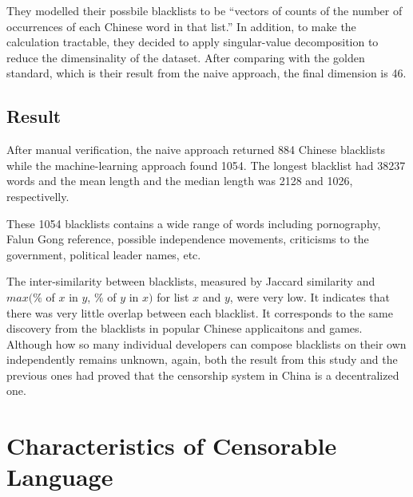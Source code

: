 \documentclass[11pt]{article} %
\begin{document}
They modelled their possbile blacklists to be ``vectors of counts of the number of occurrences of each Chinese word in that list.''\cite{knockel2018effect} In addition, to make the calculation tractable, they decided to apply singular-value decomposition to reduce the dimensinality of the dataset. After comparing with the golden standard, which is their result from the naive approach, the final dimension is 46.

\subsection{Result}

After manual verification, the naive approach returned 884 Chinese blacklists while the machine-learning approach found 1054. The longest blacklist had 38237 words and the mean length and the median length was 2128 and 1026, respectivelly.

These 1054 blacklists contains a wide range of words including pornography, Falun Gong reference, possible independence movements, criticisms to the 
government, political leader names, etc.

The inter-similarity between blacklists, measured by Jaccard similarity and $max(\% $ of $x$ in $y$, $\%$ of $y$ in $x)$ for list $x$ and $y$, were very low. It indicates that there was very little overlap between each blacklist. It corresponds to the same discovery from the blacklists in popular Chinese applicaitons and games. Although how so many individual developers can compose blacklists on their own independently remains unknown, again, both the result from this study and the previous ones had proved that the censorship system in China is a decentralized one.

\section{Characteristics of Censorable Language}

\printbibliography
\end{document}
